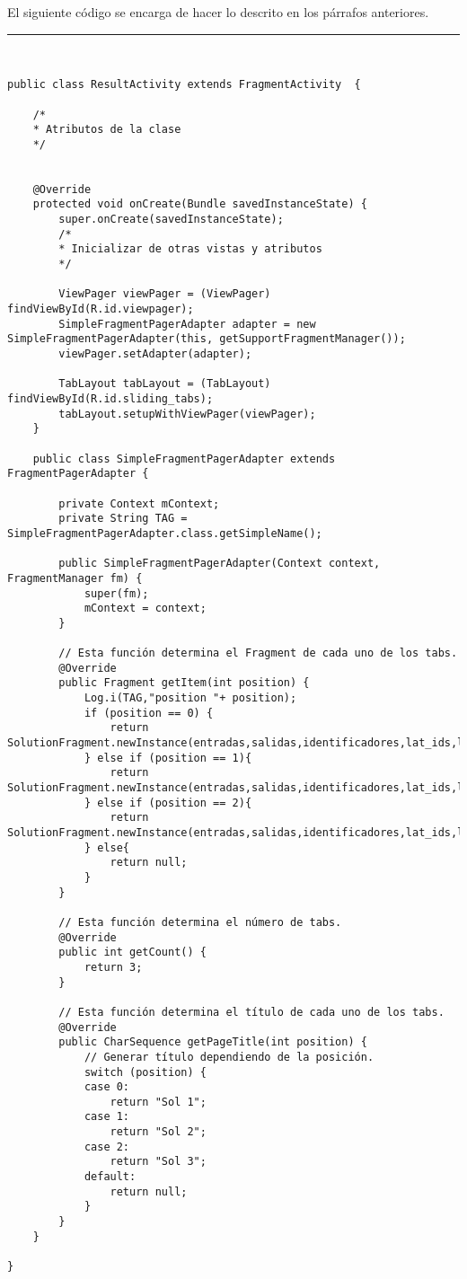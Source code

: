 El siguiente código se encarga de hacer lo descrito en los párrafos anteriores.\newline
\noindent\rule[-1ex]{\textwidth}{1pt}\\
\begin{lstlisting}[caption=Código de una vista con tabs dentro de ella.]
public class ResultActivity extends FragmentActivity  {

	/*
	* Atributos de la clase
	*/
	
	
	@Override
	protected void onCreate(Bundle savedInstanceState) {
		super.onCreate(savedInstanceState);
		/*
		* Inicializar de otras vistas y atributos
		*/
		
		ViewPager viewPager = (ViewPager) findViewById(R.id.viewpager);
		SimpleFragmentPagerAdapter adapter = new SimpleFragmentPagerAdapter(this, getSupportFragmentManager());
		viewPager.setAdapter(adapter);
		
		TabLayout tabLayout = (TabLayout) findViewById(R.id.sliding_tabs);
		tabLayout.setupWithViewPager(viewPager);
	}
	
	public class SimpleFragmentPagerAdapter extends FragmentPagerAdapter {
	
		private Context mContext;
		private String TAG = SimpleFragmentPagerAdapter.class.getSimpleName();
		
		public SimpleFragmentPagerAdapter(Context context, FragmentManager fm) {
			super(fm);
			mContext = context;
		}
		
		// Esta función determina el Fragment de cada uno de los tabs.
		@Override
		public Fragment getItem(int position) {
			Log.i(TAG,"position "+ position);
			if (position == 0) {
				return SolutionFragment.newInstance(entradas,salidas,identificadores,lat_ids,lon_ids,lat_city,lon_city);
			} else if (position == 1){
				return SolutionFragment.newInstance(entradas,salidas,identificadores,lat_ids,lon_ids,lat_city,lon_city);
			} else if (position == 2){
				return SolutionFragment.newInstance(entradas,salidas,identificadores,lat_ids,lon_ids,lat_city,lon_city);
			} else{
				return null;
			}
		}
		
		// Esta función determina el número de tabs.
		@Override
		public int getCount() {
			return 3;
		}
		
		// Esta función determina el título de cada uno de los tabs.
		@Override
		public CharSequence getPageTitle(int position) {
			// Generar título dependiendo de la posición.
			switch (position) {
			case 0:
				return "Sol 1";
			case 1:
				return "Sol 2";
			case 2:
				return "Sol 3";
			default:
				return null;
			}
		}
	}

}
\end{lstlisting}
